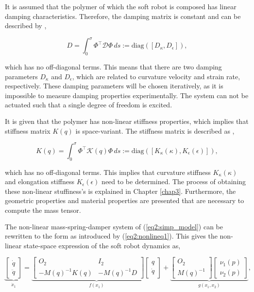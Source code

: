 {It is assumed that the polymer of which the soft robot is composed has linear damping characteristics. Therefore, the damping matrix is constant and can be described by \cite{Caasenbrood2020},

\begin{equation}
    D = \int_0^\sigma \Phi^\top \mathcal{D} \Phi \hspace{2pt} ds  := \text{diag}([D_\kappa, D_\epsilon]),
\end{equation}

which has no off-diagonal terms. This means that there are two damping parameters $D_\kappa$ and $D_\epsilon$, which are related to curvature velocity and strain rate, respectively. These damping parameters will be chosen iteratively, as it is impossible to measure damping properties experimentally. The system can not be actuated such that a single degree of freedom is excited. 

It is given that the polymer has non-linear stiffness properties, which implies that stiffness matrix $K(q)$ is space-variant. The stiffness matrix is described as \cite{Caasenbrood2020},

\begin{equation}
    K(q) = \int_0^\sigma \Phi^\top \mathcal{K}(q) \Phi \hspace{2pt} ds := \text{diag}([K_\kappa(\kappa), K_\epsilon(\epsilon)]),
\end{equation}

which has no off-diagonal terms. This implies that curvature stiffness $K_\kappa(\kappa)$ and elongation stiffness $K_\epsilon(\epsilon)$ need to be determined. The process of obtaining these non-linear stuffiness's is explained in Chapter \ref{chap3}. Furthermore, the geometric properties and material properties are presented that are necessary to compute the mass tensor. 

The non-linear mass-spring-damper system of (\ref{eq2:simp_model}) can be rewritten to the form as introduced by (\ref{eq2:nonlineq1}). This gives the non-linear state-space expression of the soft robot dynamics as,


\begin{equation}
    \underbrace{\begin{bmatrix}\dot{q}\\ \ddot{q}  \end{bmatrix}}_{\dot{x}_1}   = \underbrace{  \begin{bmatrix} O_{2} & I_{2} \\ -M(q)^{-1}K(q)  & -M(q)^{-1} D \end{bmatrix}   \begin{bmatrix} q \\ \dot{q} \end{bmatrix} }_{f(x_1)}  +      \underbrace{ \begin{bmatrix} O_{2} \\ M(q)^{-1}   \end{bmatrix}       \begin{bmatrix} \nu_1(p) \\ \nu_2(p)  
    \end{bmatrix} }_{g(x_1,x_2)}, 
    \label{eq4:SS}
\end{equation}

}
